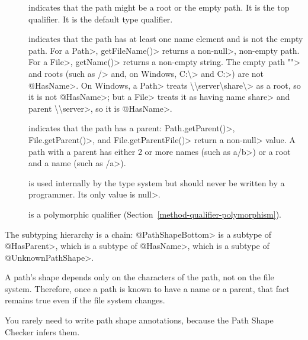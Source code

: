 \begin{description}

\item[]
  indicates that the path might be a root or the empty path.
  It is the top qualifier.
  It is the default type qualifier.

\item[]
  indicates that the path has at least one name element and is not the
  empty path.  For a \<Path>, \<getFileName()> returns a non-\<null>,
  non-empty path.  For a \<File>, \<getName()> returns a non-empty string.
  The empty path \<""> and roots (such as \</> and, on Windows,
  \<C:\textbackslash{}> and \<C:>) are not \<@HasName>.  On Windows, a
  \<Path> treats
  \<\textbackslash{}\textbackslash{}server\textbackslash{}share\textbackslash{}>
  as a root, so it is not \<@HasName>; but a \<File> treats it as having
  name \<share> and parent
  \<\textbackslash{}\textbackslash{}server>, so it is \<@HasName>.

\item[]
  indicates that the path has a parent:  \<Path.getParent()>,
  \<File.getParent()>, and \<File.getParentFile()> return a non-\<null>
  value.  A path with a parent has either 2 or more names (such as
  \<a/b>) or a root and a name (such as \</a>).

\item[]
  is used internally by the type system but should never be written by a
  programmer.  Its only value is \<null>.

\item[]
  is a polymorphic qualifier (Section~\ref{method-qualifier-polymorphism}).

\end{description}

The subtyping hierarchy is a chain:  \<@PathShapeBottom> is a subtype of
\<@HasParent>, which is a subtype of \<@HasName>, which is a subtype of
\<@UnknownPathShape>.

A path's shape depends only on the characters of the path, not on the file
system.  Therefore, once a path is known to have a name or a parent, that
fact remains true even if the file system changes.

You rarely need to write path shape annotations, because the Path Shape
Checker infers them.


